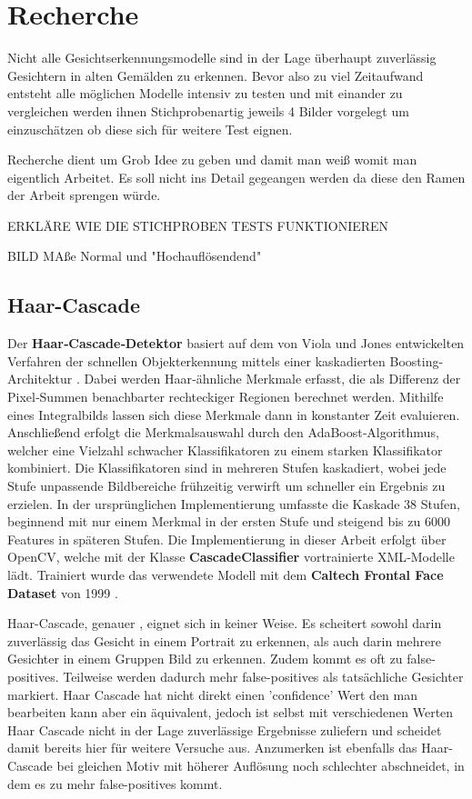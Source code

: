 \chapter{Recherche}

Nicht alle Gesichtserkennungsmodelle sind in der Lage überhaupt zuverlässig Gesichtern in alten Gemälden zu erkennen. Bevor also zu viel Zeitaufwand entsteht alle möglichen Modelle intensiv zu testen und mit einander zu vergleichen werden ihnen Stichprobenartig jeweils 4 Bilder vorgelegt um einzuschätzen ob diese sich für weitere Test eignen.

Recherche dient um Grob Idee zu geben und damit man weiß womit man eigentlich Arbeitet. Es soll nicht ins Detail gegeangen werden da diese den Ramen der Arbeit sprengen würde.

ERKLÄRE WIE DIE STICHPROBEN TESTS FUNKTIONIEREN

BILD MAße Normal und "Hochauflösendend"

\section{Haar-Cascade}
Der \textbf{Haar‑Cascade‑Detektor} basiert auf dem von Viola und Jones entwickelten Verfahren der schnellen Objekterkennung mittels einer kaskadierten Boosting-Architektur \parencite{ViolaJones2001}. Dabei werden Haar‑ähnliche Merkmale erfasst, die als Differenz der Pixel‑Summen benachbarter rechteckiger Regionen berechnet werden. Mithilfe eines Integralbilds lassen sich diese Merkmale dann in konstanter Zeit evaluieren. Anschließend erfolgt die Merkmalsauswahl durch den AdaBoost‑Algorithmus, welcher eine Vielzahl schwacher Klassifikatoren zu einem starken Klassifikator kombiniert. Die Klassifikatoren sind in mehreren Stufen kaskadiert, wobei jede Stufe unpassende Bildbereiche frühzeitig verwirft um schneller ein Ergebnis zu erzielen. In der ursprünglichen Implementierung umfasste die Kaskade 38 Stufen, beginnend mit nur einem Merkmal in der ersten Stufe und steigend bis zu 6000 Features in späteren Stufen. Die Implementierung in dieser Arbeit erfolgt über OpenCV, welche mit der Klasse \textbf{CascadeClassifier} vortrainierte XML‑Modelle lädt. Trainiert wurde das verwendete  Modell mit dem \textbf{Caltech Frontal Face Dataset} von 1999 \parencite[101–102]{howse2019opencv}.

Haar-Cascade, genauer , eignet sich in keiner Weise. Es scheitert sowohl darin zuverlässig das Gesicht in einem Portrait zu erkennen, als auch darin mehrere Gesichter in einem Gruppen Bild zu erkennen. Zudem kommt es oft zu false-positives. Teilweise werden dadurch mehr false-positives als tatsächliche Gesichter markiert. Haar Cascade hat nicht direkt einen 'confidence' Wert den man bearbeiten kann aber ein äquivalent, jedoch ist selbst mit verschiedenen Werten Haar Cascade nicht in der Lage zuverlässige Ergebnisse zuliefern und scheidet damit bereits hier für weitere Versuche aus.
Anzumerken ist ebenfalls das Haar-Cascade bei gleichen Motiv mit höherer Auflösung noch schlechter abschneidet, in dem es zu mehr false-positives kommt.

